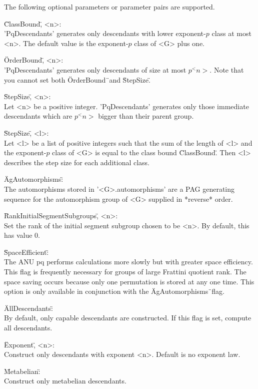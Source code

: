 The following optional parameters or parameter pairs are supported.

\"ClassBound\", <n>: \\
    'PqDescendants' generates  only  descendants  with lower exponent-$p$
    class  at most  <n>.  The default value is  the exponent-$p$ class of
    <G> plus one.

\"OrderBound\", <n>: \\
    'PqDescendants' generates only descendants of  size at  most $p^<n>$.
    Note that you cannot set both \"OrderBound\"\ and \"StepSize\".

\"StepSize\", <n>: \\
    Let <n> be a  positive integer.  'PqDescendants' generates only those
    immediate  descendants  which are $p^<n>$  bigger  than  their parent
    group.

\"StepSize\", <l>: \\
    Let <l> be a  list of  positive  integers such that  the  sum  of the
    length of <l> and the exponent-$p$ class of <G> is equal to the class
    bound \"ClassBound\".  Then  <l> describes  the  step size  for  each
    additional class.

\"AgAutomorphisms\": \\
    The automorphisms stored in '<G>.automorphisms' are  a PAG generating
    sequence for  the  automorphism group  of  <G> supplied in  *reverse*
    order.

\"RankInitialSegmentSubgroups\", <n>: \\
    Set the rank  of the  initial  segment  subgroup chosen to  be <n>.
    By default, this has value 0.

\"SpaceEfficient\": \\
    The ANU  pq performs  calculations  more slowly but with greater space
    efficiency.
    This  flag is  frequently  necessary  for  groups of  large  Frattini
    quotient rank.  The space  saving occurs because only one permutation
    is  stored at  any  one  time.   This option  is  only  available  in
    conjunction with the \"AgAutomorphisms\"\ flag.

\"AllDescendants\": \\
    By default, only capable descendants are constructed. If this flag
    is set, compute all descendants.

\"Exponent\", <n>: \\
    Construct only descendants with exponent <n>.  Default is no exponent
    law.

\"Metabelian\": \\
    Construct only metabelian descendants.

